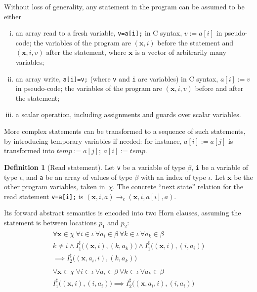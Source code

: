 \documentclass[a4paper]{article}
\newcommand{\ve}[1]{\mathbf{#1}}
\newcommand{\vx}{\ve{x}}
\newcommand{\abstr}[1]{#1^\sharp}
\theoremstyle{definition}
\newtheorem{definition}{Definition}
\theoremstyle{plain}
\newcommand{\rulespacing}{\\[0.4em]}
\begin{document}
Without loss of generality, any statement in the program can be assumed to be either
\begin{enumerate}[i)]
\item an array read to a fresh variable,
  \lstinline|v=a[i];| in C syntax, $v:=a[i]$ in pseudo-code;
  the variables of the program are $(\vx,i)$ before the statement
  and $(\vx,i,v)$ after the statement, where $\vx$ is a vector of arbitrarily
  many variables;
\item an array write, \lstinline|a[i]=v;| (where \lstinline|v| and \lstinline|i| are variables) in C syntax,  $a[i]:=v$ in pseudo-code;
  the variables of the program are $(\vx,i,v)$ before and after the statement;
\item a scalar operation, including assignments and guards over scalar variables.
\end{enumerate}
More complex statements can be transformed to a sequence of such statements, by introducing temporary variables if needed: for instance, $a[i]:=a[j]$ is transformed into $\mathit{temp}:=a[j];~ a[i]:=\mathit{temp}$.

\begin{definition}[Read statement]\label{def:read1}
Let \lstinline|v| be a variable of type $\beta$,
\lstinline|i| be a variable of type $\iota$,
and \lstinline|a| be an array of values of type $\beta$ with an index of type $\iota$.
Let $\vx$ be the other program variables, taken in~$\chi$.
The concrete ``next state'' relation for the read statement \lstinline|v=a[i];|
is $(\vx,i,a) \rightarrow_c (\vx,i,a[i],a)$.

Its forward abstract semantics is encoded into two Horn clauses, assuming the statement is between locations $p_1$ and $p_2$:
\begin{align}\label{rule:read1_different}
\begin{aligned}
\forall \vx \in \chi~ \forall i \in \iota~ \forall a_i \in \beta~
  \forall k \in \iota~ \forall a_k \in \beta\\
  k \neq i \land \abstr{I}_1\big((\vx,i),(k,a_k)\big) \land
                 \abstr{I}_1\big((\vx,i),(i,a_i)\big) \\ \implies
  \abstr{I}_2\big((\vx,a_i,i),(k,a_k)\big)
\end{aligned}\rulespacing\label{rule:read1_same}
\begin{aligned}
\forall \vx \in \chi~ \forall i \in \iota~ \forall a_i \in \beta~
  \forall k \in \iota~ \forall a_k \in \beta\\
  \abstr{I}_1\big((\vx,i),(i,a_i)\big) \implies
  \abstr{I}_2\big((\vx,a_i,i),(i,a_i)\big)
\end{aligned}
\end{align}
\end{definition}
\end{document}
